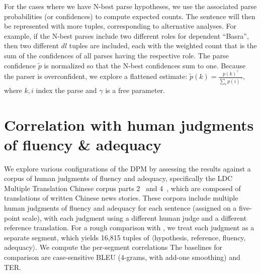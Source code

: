 \documentclass{kluwer}    %
\begin{document}
\begin{article}
For the cases where we have N-best parse hypotheses, we use the associated
parse probabilities (or confidences) to compute expected
counts. The sentence will then be represented with more tuples,
corresponding to alternative analyses. For example, if the N-best
parses include two different roles for dependent ``Basra'', then two
different $dl$ tuples are included, each with the weighted count that is the
sum of the confidences of all parses having the respective role.
The parse confidence $\tilde{p}$ is normalized so that the
N-best confidences sum to one. Because the parser is overconfident, we
explore a flattened estimate: $\tilde{p}(k) =
\frac{p(k)^\gamma}{\sum_ip(i)^\gamma},$ where $k,i$ index the parse and
$\gamma$ is a free parameter.


\section{Correlation with human judgments of fluency \& adequacy}
\label{sec:faexpts}

We explore various configurations of the DPM by assessing the results
against a corpus of human judgments of fluency and adequacy,
specifically the LDC Multiple Translation Chinese corpus parts
2~\cite{LDC03MTC2} and 4~\cite{LDC06MTC4}, which are composed of
translations of written Chinese news stories.  These corpora include
multiple human judgments of fluency and adequacy for each sentence
(assigned on a five-point scale), with each judgment using a different
human judge and a different reference translation.  For a
rough comparison with
, we treat each judgment as a
separate segment, which yields 16,815 tuples of $\langle$hypothesis,
reference, fluency, adequacy$\rangle$.  We compute the per-segment
correlations
%
The baselines for comparison are case-sensitive BLEU (4-grams, with add-one smoothing) and TER. 


\end{article}
\end{document}
